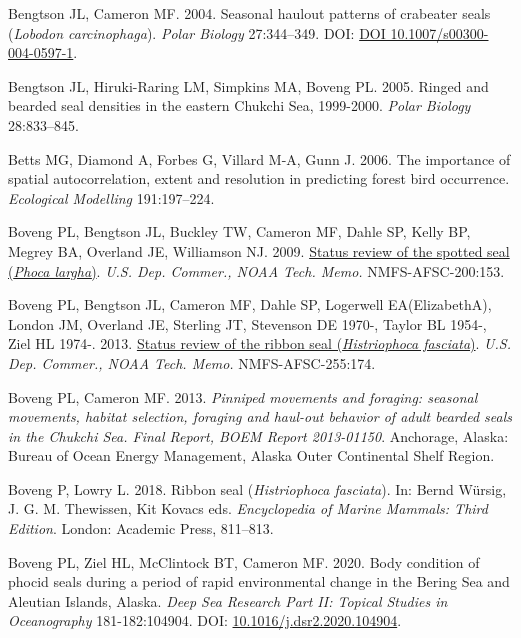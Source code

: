 \documentclass[fleqn,10pt,lineno]{wlpeerj} %
\newlength{\cslhangindent}
\newlength{\cslentryspacingunit} %
\newenvironment{CSLReferences}[2] %
 {%
  \setlength{\parindent}{0pt}
  \ifodd #1
  \let\oldpar\par
  \def\par{\hangindent=\cslhangindent\oldpar}
  \fi
  \setlength{\parskip}{#2\cslentryspacingunit}
 }%
 {}
\begin{document}
\hypertarget{refs}{}
\begin{CSLReferences}{1}{0}
\leavevmode{}%
Bengtson JL, Cameron MF. 2004. Seasonal haulout patterns of crabeater seals (\emph{Lobodon carcinophaga}). \emph{Polar Biology} 27:344--349. DOI: \href{https://doi.org/DOI\%2010.1007/s00300-004-0597-1}{DOI 10.1007/s00300-004-0597-1}.

\leavevmode{}%
Bengtson JL, Hiruki-Raring LM, Simpkins MA, Boveng PL. 2005. Ringed and bearded seal densities in the eastern Chukchi Sea, 1999-2000. \emph{Polar Biology} 28:833--845.

\leavevmode{}%
Betts MG, Diamond A, Forbes G, Villard M-A, Gunn J. 2006. The importance of spatial autocorrelation, extent and resolution in predicting forest bird occurrence. \emph{Ecological Modelling} 191:197--224.

\leavevmode{}%
Boveng PL, Bengtson JL, Buckley TW, Cameron MF, Dahle SP, Kelly BP, Megrey BA, Overland JE, Williamson NJ. 2009. \href{https://repository.library.noaa.gov/view/noaa/3671}{Status review of the spotted seal (\emph{Phoca largha})}. \emph{U.S. Dep. Commer., NOAA Tech. Memo.} NMFS-AFSC-200:153.

\leavevmode{}%
Boveng PL, Bengtson JL, Cameron MF, Dahle SP, Logerwell EA(ElizabethA), London JM, Overland JE, Sterling JT, Stevenson DE 1970-, Taylor BL 1954-, Ziel HL 1974-. 2013. \href{https://repository.library.noaa.gov/view/noaa/4451}{Status review of the ribbon seal (\emph{Histriophoca fasciata})}. \emph{U.S. Dep. Commer., NOAA Tech. Memo.} NMFS-AFSC-255:174.

\leavevmode{}%
Boveng PL, Cameron MF. 2013. \emph{Pinniped movements and foraging: seasonal movements, habitat selection, foraging and haul-out behavior of adult bearded seals in the Chukchi Sea. Final Report, BOEM Report 2013-01150}. Anchorage, Alaska: Bureau of Ocean Energy Management, Alaska Outer Continental Shelf Region.

\leavevmode{}%
Boveng P, Lowry L. 2018. Ribbon seal (\emph{Histriophoca fasciata}). In: Bernd Würsig, J. G. M. Thewissen, Kit Kovacs eds. \emph{Encyclopedia of Marine Mammals: Third Edition}. London: Academic Press, 811--813.

\leavevmode{}%
Boveng PL, Ziel HL, McClintock BT, Cameron MF. 2020. Body condition of phocid seals during a period of rapid environmental change in the Bering Sea and Aleutian Islands, Alaska. \emph{Deep Sea Research Part II: Topical Studies in Oceanography} 181-182:104904. DOI: \href{https://doi.org/10.1016/j.dsr2.2020.104904}{10.1016/j.dsr2.2020.104904}.


\end{CSLReferences}
\end{document}
